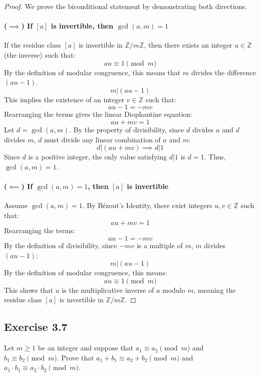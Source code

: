 \begin{proof}
We prove the biconditional statement by demonstrating both directions.

\paragraph{($\implies$) If $[a]$ is invertible, then $\gcd(a, m)=1$}
If the residue class $[a]$ is invertible in $\mathbb{Z}/m\mathbb{Z}$, then there exists an integer $u \in \mathbb{Z}$ (the inverse) such that:
$$ au \equiv 1 \pmod{m} $$
By the definition of modular congruence, this means that $m$ divides the difference $(au - 1)$.
$$ m | (au - 1) $$
This implies the existence of an integer $v \in \mathbb{Z}$ such that:
$$ au - 1 = -mv $$
Rearranging the terms gives the linear Diophantine equation:
$$ au + mv = 1 $$
Let $d = \gcd(a, m)$. By the property of divisibility, since $d$ divides $a$ and $d$ divides $m$, $d$ must divide any linear combination of $a$ and $m$:
$$ d | (au + mv) \implies d | 1 $$
Since $d$ is a positive integer, the only value satisfying $d|1$ is $d=1$.
Thus, $\gcd(a, m) = 1$.

\paragraph{($\impliedby$) If $\gcd(a, m)=1$, then $[a]$ is invertible}
Assume $\gcd(a, m) = 1$. By Bézout's Identity, there exist integers $u, v \in \mathbb{Z}$ such that:
$$ au + mv = 1 $$
Rearranging the terms:
$$ au - 1 = -mv $$
By the definition of divisibility, since $-mv$ is a multiple of $m$, $m$ divides $(au - 1)$:
$$ m | (au - 1) $$
By the definition of modular congruence, this means:
$$ au \equiv 1 \pmod{m} $$
This shows that $u$ is the multiplicative inverse of $a$ modulo $m$, meaning the residue class $[a]$ is invertible in $\mathbb{Z}/m\mathbb{Z}$.
\end{proof}

\subsection*{Exercise 3.7}
Let $m \ge 1$ be an integer and suppose that $a_1 \equiv a_2 \pmod{m}$ and $b_1 \equiv b_2 \pmod{m}$. Prove that $a_1+b_1 \equiv a_2+b_2 \pmod{m}$ and $a_1 \cdot b_1 \equiv a_2 \cdot b_2 \pmod{m}$.

